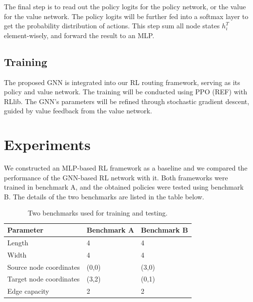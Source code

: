 \documentclass[letterpaper]{article}
\begin{document}
The final step is to read out the policy logits for the policy network, or the
value for the value network. The policy logits will be further fed into a
softmax layer to get the probability distribution of actions. This step sum all
node states $h_i^T$ element-wisely, and forward the result to an MLP.
\subsection{Training}
The proposed GNN is integrated into our RL routing framework, serving as its
policy and value network. The training will be conducted using PPO (REF) with
RLlib. The GNN's parameters will be refined through stochastic gradient descent,
guided by value feedback from the value network.

    
\section{Experiments}
We constructed an MLP-based RL framework as a baseline and we compared the
performance of the GNN-based RL network with it. Both frameworks were trained in
benchmark A, and the obtained policies were tested using benchmark B. The
details of the two benchmarks are listed in the table below.


\begin{table}[h!]
    \caption{Two benchmarks used for training and testing.}
    \centering
    \begin{tabularx}{\textwidth}{LLL}
        \toprule
        Parameter & Benchmark A & Benchmark B \\
        \midrule
        Length & 4 & 4 \\
        Width & 4 & 4 \\
        Source node coordinates & (0,0) & (3,0) \\
        Target node coordinates & (3,2) & (0,1) \\
        Edge capacity & 2 & 2 \\
        \bottomrule
    \end{tabularx}
\end{table}
\end{document}
